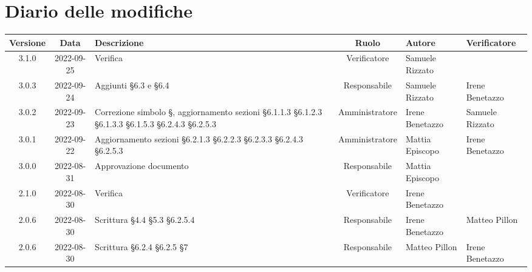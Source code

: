 \section*{Diario delle modifiche}
	\begin{center}
	\renewcommand{\arraystretch}{1.8} %
	\begin{longtable}{ |c|c|p{8em}|c|m{5em}|m{5em}| }
	\hline
	\textbf{Versione} & \textbf{Data} & \textbf{Descrizione} &  \textbf{Ruolo} &  \textbf{Autore} & \textbf{Verificatore}\\ %
	\hline %
	3.1.0 & 2022-09-25 & Verifica & Verificatore & Samuele \newline Rizzato & \\
	\hline
	3.0.3 & 2022-09-24 & Aggiunti §6.3 e §6.4 & Responsabile & Samuele \newline Rizzato & Irene \newline Benetazzo\\
	\hline
	3.0.2 & 2022-09-23 & Correzione simbolo §, aggiornamento sezioni §6.1.1.3 §6.1.2.3 §6.1.3.3 §6.1.5.3 §6.2.4.3 §6.2.5.3& Amministratore & Irene \newline Benetazzo & Samuele \newline Rizzato\\
	\hline
	3.0.1 & 2022-09-22 & Aggiornamento sezioni §6.2.1.3 §6.2.2.3 §6.2.3.3 §6.2.4.3 §6.2.5.3 & Amministratore & Mattia \newline Episcopo & Irene \newline Benetazzo \\
	\hline
	3.0.0 & 2022-08-31 & Approvazione documento & Responsabile & Mattia \newline Episcopo & \\
	\hline
	2.1.0 & 2022-08-30 & Verifica & Verificatore & Irene \newline Benetazzo & \\
	\hline 
	2.0.6 & 2022-08-30 & Scrittura §4.4 §5.3 §6.2.5.4 & Responsabile & Irene \newline Benetazzo & Matteo \newline Pillon  \\	
	\hline
	2.0.6 & 2022-08-30 & Scrittura §6.2.4 §6.2.5 §7 & Responsabile & Matteo \newline Pillon & Irene \newline Benetazzo  \\	

\end{longtable}
\end{center}
